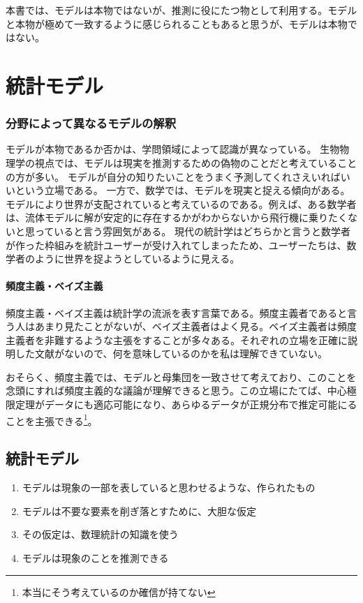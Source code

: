 本書では、モデルは本物ではないが、推測に役にたつ物として利用する。モデルと本物が極めて一致するように感じられることもあると思うが、モデルは本物ではない。

\section{統計モデル}


\subsubsection{分野によって異なるモデルの解釈}
モデルが本物であるか否かは、学問領域によって認識が異なっている。
生物物理学の視点では、モデルは現実を推測するための偽物のことだと考えていることの方が多い。
モデルが自分の知りたいことをうまく予測してくれさえいればいいという立場である。
一方で、数学では、モデルを現実と捉える傾向がある。モデルにより世界が支配されていると考えているのである。例えば、ある数学者は、流体モデルに解が安定的に存在するかがわからないから飛行機に乗りたくないと思っていると言う雰囲気がある。
現代の統計学はどちらかと言うと数学者が作った枠組みを統計ユーザーが受け入れてしまったため、ユーザーたちは、数学者のように世界を捉ようとしているように見える。


\begin{mybox}
    \paragraph{頻度主義・ベイズ主義}
    頻度主義・ベイズ主義は統計学の流派を表す言葉である。頻度主義者であると言う人はあまり見たことがないが、ベイズ主義者はよく見る。ベイズ主義者は頻度主義者を非難するような主張をすることが多々ある。それぞれの立場を正確に説明した文献がないので、何を意味しているのかを私は理解できていない。

    おそらく、頻度主義では、モデルと母集団を一致させて考えており、このことを念頭にすれば頻度主義的な議論が理解できると思う。この立場にたてば、中心極限定理がデータにも適応可能になり、あらゆるデータが正規分布で推定可能にることを主張できる\footnote{本当にそう考えているのか確信が持てない}。
\end{mybox}


\subsection{統計モデル}
\begin{enumerate}
    \item モデルは現象の一部を表していると思わせるような、作られたもの
    \item モデルは不要な要素を削ぎ落とすために、大胆な仮定
    \item その仮定は、数理統計の知識を使う
    \item モデルは現象のことを推測できる
\end{enumerate}

